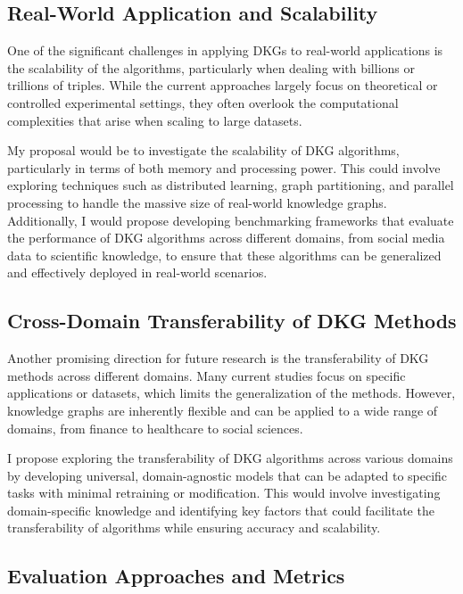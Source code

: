 \subsection{Real-World Application and Scalability}

One of the significant challenges in applying DKGs to real-world applications is the scalability of the algorithms, particularly when dealing with billions or trillions of triples. 
While the current approaches largely focus on theoretical or controlled experimental settings, they often overlook the computational complexities that arise when scaling to large datasets. 

My proposal would be to investigate the scalability of DKG algorithms, particularly in terms of both memory and processing power. This could involve exploring techniques such as distributed 
learning, graph partitioning, and parallel processing to handle the massive size of real-world knowledge graphs. Additionally, I would propose developing benchmarking frameworks that evaluate 
the performance of DKG algorithms across different domains, from social media data to scientific knowledge, to ensure that these algorithms can be generalized and effectively deployed in 
real-world scenarios.

\subsection{Cross-Domain Transferability of DKG Methods}

Another promising direction for future research is the transferability of DKG methods across different domains. Many current studies focus on specific applications or datasets, which limits 
the generalization of the methods. However, knowledge graphs are inherently flexible and can be applied to a wide range of domains, from finance to healthcare to social sciences. 

I propose exploring the transferability of DKG algorithms across various domains by developing universal, domain-agnostic models that can be adapted to specific tasks with minimal retraining 
or modification. This would involve investigating domain-specific knowledge and identifying key factors that could facilitate the transferability of algorithms while ensuring accuracy and 
scalability.

\subsection{Evaluation Approaches and Metrics}

